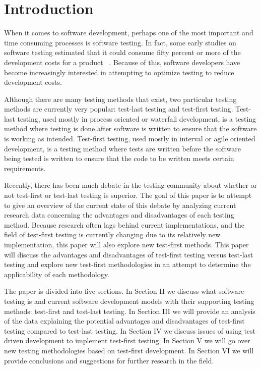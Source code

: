\documentclass{sig-alternate}
\begin{document}
\section{Introduction}
When it comes to software development, perhaps one of the most important and time consuming processes is software testing.  In fact, some early studies on software testing estimated that it could consume fifty percent or more of the development costs for a product ~\cite{Bertolino:2007}.  Because of this, software developers have become increasingly interested in attempting to optimize testing to reduce development costs.

Although there are many testing methods that  exist, two particular testing methods are currently very popular: test-last testing and test-first testing.  Test-last testing, used mostly in process oriented or waterfall development, is a testing method where testing is done after software is written to ensure that the software is working as intended.  Test-first testing, used mostly in interval or agile oriented development, is a testing method where tests are written before the software being tested is written to ensure that the code to be written meets certain requirements.

Recently, there has been much debate in the testing community about whether or not test-first or test-last testing is superior.  The goal of this paper is to attempt to give an overview of the current state of this debate by analyzing current research data concerning the advantages and disadvantages of each testing method.  Because research often lags behind current implementations, and the field of test-first testing is currently changing due to its relatively new implementation, this paper will also explore new test-first methods.  This paper will discuss the advantages and disadvantages of test-first testing versus test-last testing and explore new test-first methodologies in an attempt to determine the applicability of each methodology.

The paper is divided into five sections.  In Section II we discuss what software testing is and current software development models with their supporting testing methods: test-first and test-last testing.  In Section III we will provide an analysis of the data explaining the potential advantages and disadvantages of test-first testing compared to test-last testing.  In Section IV we discuss issues of using test driven development to implement test-first testing. In Section V we will go over new testing methodologies based on test-first development. In Section VI we will provide conclusions and suggestions for further research in the field.
\end{document}
